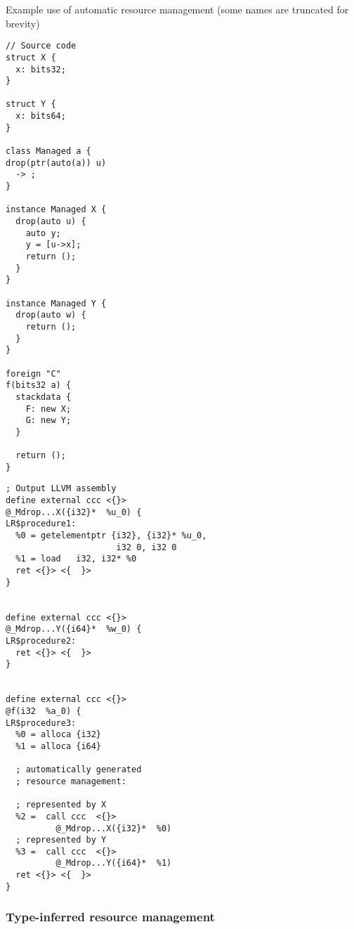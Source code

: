 \begin{codex}
    \small
    \caption{Example use of automatic resource management (some names are truncated for brevity)}
    \label{lst:resource}
    \begin{center}
    \begin{minipage}{0.35\linewidth}
    \begin{lstlisting}
// Source code
struct X {
  x: bits32;
}

struct Y {
  x: bits64;
}

class Managed a {
drop(ptr(auto(a)) u)
  -> ;
}

instance Managed X {
  drop(auto u) {
    auto y;
    y = [u->x];
    return ();
  }
}

instance Managed Y {
  drop(auto w) {
    return ();
  }
}

foreign "C"
f(bits32 a) {
  stackdata {
    F: new X;
    G: new Y;
  }

  return ();
}
    \end{lstlisting}
    \end{minipage}%
    \begin{minipage}{0.65\linewidth}
    \begin{lstlisting}[style=llvmStyle]
; Output LLVM assembly
define external ccc <{}>
@_Mdrop...X({i32}*  %u_0) {
LR$procedure1:
  %0 = getelementptr {i32}, {i32}* %u_0,
                      i32 0, i32 0
  %1 = load   i32, i32* %0
  ret <{}> <{  }>
}


define external ccc <{}>
@_Mdrop...Y({i64}*  %w_0) {
LR$procedure2:
  ret <{}> <{  }>
}


define external ccc <{}>
@f(i32  %a_0) {
LR$procedure3:
  %0 = alloca {i32}
  %1 = alloca {i64}

  ; automatically generated
  ; resource management:

  ; represented by X
  %2 =  call ccc  <{}>
          @_Mdrop...X({i32}*  %0)
  ; represented by Y
  %3 =  call ccc  <{}>
          @_Mdrop...Y({i64}*  %1)
  ret <{}> <{  }>
}
    \end{lstlisting}
    \end{minipage}
    \end{center}
\end{codex}

\subsubsection{Type-inferred resource management}

